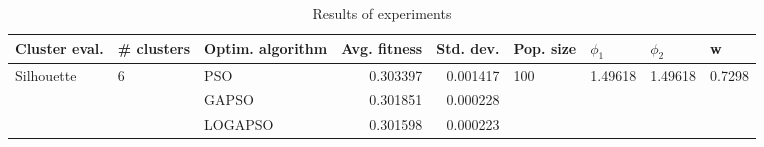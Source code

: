\begin{table}
\centering
\caption{Results of experiments}
\begin{tabular}{lllrrllll}
\toprule
              Cluster eval. &        \# clusters & Optim. algorithm &  Avg. fitness &  Std. dev. &            Pop. size &               $\phi_{1}$ &               $\phi_{2}$ &                       w \\
\midrule
\multirow{3}{*}{Silhouette} & \multirow{3}{*}{6} &              PSO &      0.303397 &   0.001417 & \multirow{3}{*}{100} & \multirow{3}{*}{1.49618} & \multirow{3}{*}{1.49618} & \multirow{3}{*}{0.7298} \\
                            &                    &            GAPSO &      0.301851 &   0.000228 &                      &                          &                          &                         \\
                            &                    &          LOGAPSO &      0.301598 &   0.000223 &                      &                          &                          &                         \\
\bottomrule
\end{tabular}
\end{table}
